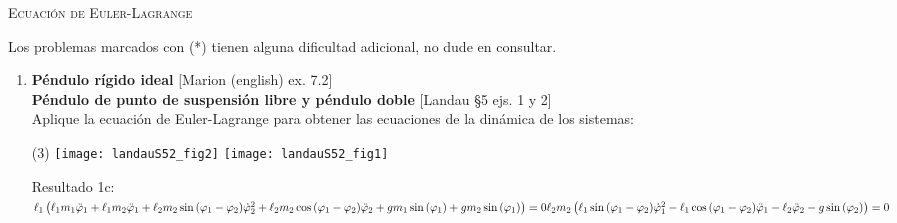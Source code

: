 \documentclass[11pt, a4paper, twoside]{article}
\begin{document}
\begin{center}
  \textsc{\large Ecuación de Euler-Lagrange}
\end{center}

\noindent
Los problemas marcados con (*) tienen alguna dificultad adicional, no dude en consultar.
\begin{enumerate} 


\item
\textbf{Péndulo rígido ideal} [Marion (english) ex. 7.2] \\
\textbf{Péndulo de punto de suspensión libre y péndulo doble} [Landau \S5 ejs. 1 y 2]\\ 
Aplique la ecuación de Euler-Lagrange para obtener las ecuaciones de la dinámica de los sistemas:
\begin{tasks}(3)
	\task 
	\task \texttt{[image: landauS52\_fig2]}
	\task \texttt{[image: landauS52\_fig1]}
\end{tasks}
Resultado 1c:\\
\(
	\ell_{1} \left(\ell_{1} m_{1} \ddot{\varphi}_{1} + \ell_{1} m_{2} \ddot{\varphi}_{1} + \ell_{2} m_{2} \sin{\left(\varphi_{1} - \varphi_{2} \right)} \dot{\varphi}_{2}^{2} + \ell_{2} m_{2} \cos{\left(\varphi_{1} - \varphi_{2} \right)} \ddot{\varphi}_{2} + g m_{1} \sin{\left(\varphi_{1} \right)} + g m_{2} \sin{\left(\varphi_{1} \right)}\right) = 0 \\[10 pt]
	\ell_{2} m_{2} \left(\ell_{1} \sin{\left(\varphi_{1} - \varphi_{2} \right)} \dot{\varphi}_{1}^{2} - \ell_{1} \cos{\left(\varphi_{1} - \varphi_{2} \right)} \ddot{\varphi}_{1} - \ell_{2} \ddot{\varphi}_{2} - g \sin{\left(\varphi_{2} \right)}\right) = 0
\)



\end{enumerate}
\end{document}
